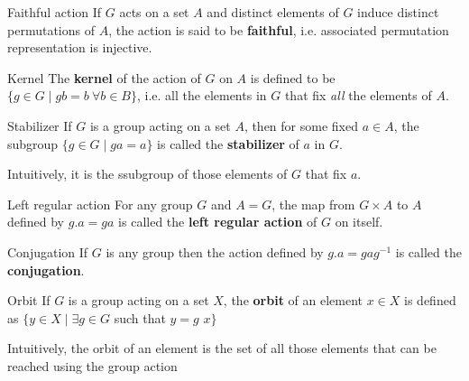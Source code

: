 \documentclass[titlepage, 12pt]{article}
\begin{document}
\begin{definition}{Faithful action}{}
If $G$ acts on a set $A$ and distinct elements of $G$ induce distinct
permutations of $A$, the action is said to be \textbf{faithful}, i.e. associated
permutation representation is injective.
\end{definition}

\begin{definition}{Kernel}{}
The \textbf{kernel} of the action of $G$ on $A$ is defined to be $\{g\in G\mid
gb = b\ \forall b\in B\}$, i.e. all the elements in $G$ that fix \textit{all}
the elements of $A$.
\end{definition}

\begin{definition}{Stabilizer}{}
If $G$ is a group acting on a set $A$, then for some fixed $a\in A$, the
subgroup $\{g\in G\mid ga=a\}$ is called the \textbf{stabilizer} of $a$ in $G$.
\end{definition}

Intuitively, it is the ssubgroup of those elements of $G$ that fix $a$.

\begin{definition}{Left regular action}{}
    For any group $G$ and $A = G$, the map from $G\times A$ to $A$ defined by
    $g.a = ga$ is called the \textbf{left regular action} of $G$ on itself.
\end{definition}

\begin{definition}{Conjugation}{}
    If $G$ is any group then the action defined by $g.a = gag^{-1}$ is called
    the \textbf{conjugation}.
\end{definition}


\begin{definition}{Orbit}{}
    If $G$ is a group acting on a set $X$, the \textbf{orbit} of an element
    $x\in X$ is defined as $\{y\in X\mid\exists g\in G$ such that $y = g$ 
    $x\}$
\end{definition}
Intuitively, the orbit of an element is the set of all those elements that can
be reached using the group action
\end{document}
